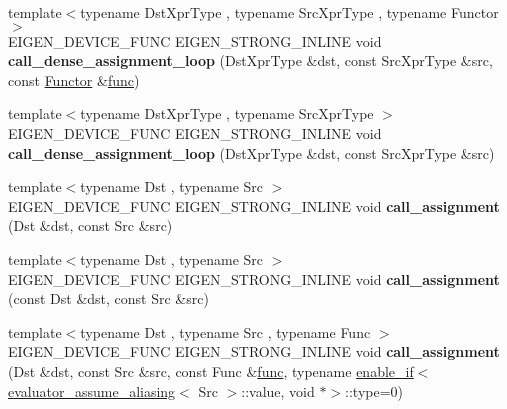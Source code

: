 \begin{DoxyCompactItemize}
{\footnotesize template$<$typename Dst\+Xpr\+Type , typename Src\+Xpr\+Type , typename Functor $>$ }\\E\+I\+G\+E\+N\+\_\+\+D\+E\+V\+I\+C\+E\+\_\+\+F\+U\+NC E\+I\+G\+E\+N\+\_\+\+S\+T\+R\+O\+N\+G\+\_\+\+I\+N\+L\+I\+NE void {\bfseries call\+\_\+dense\+\_\+assignment\+\_\+loop} (Dst\+Xpr\+Type \&dst, const Src\+Xpr\+Type \&src, const \hyperlink{struct_functor}{Functor} \&\hyperlink{structfunc}{func})
\item 
\mbox{\label{namespace_eigen_1_1internal_ac2c8860de31cf24c929f08fb6629eea2}} 
{\footnotesize template$<$typename Dst\+Xpr\+Type , typename Src\+Xpr\+Type $>$ }\\E\+I\+G\+E\+N\+\_\+\+D\+E\+V\+I\+C\+E\+\_\+\+F\+U\+NC E\+I\+G\+E\+N\+\_\+\+S\+T\+R\+O\+N\+G\+\_\+\+I\+N\+L\+I\+NE void {\bfseries call\+\_\+dense\+\_\+assignment\+\_\+loop} (Dst\+Xpr\+Type \&dst, const Src\+Xpr\+Type \&src)
\item 
\mbox{\label{namespace_eigen_1_1internal_a77793e4b74b9919e35295c839f2659b2}} 
{\footnotesize template$<$typename Dst , typename Src $>$ }\\E\+I\+G\+E\+N\+\_\+\+D\+E\+V\+I\+C\+E\+\_\+\+F\+U\+NC E\+I\+G\+E\+N\+\_\+\+S\+T\+R\+O\+N\+G\+\_\+\+I\+N\+L\+I\+NE void {\bfseries call\+\_\+assignment} (Dst \&dst, const Src \&src)
\item 
\mbox{\label{namespace_eigen_1_1internal_aa3db05ef2ee5dcf41ed295e769476879}} 
{\footnotesize template$<$typename Dst , typename Src $>$ }\\E\+I\+G\+E\+N\+\_\+\+D\+E\+V\+I\+C\+E\+\_\+\+F\+U\+NC E\+I\+G\+E\+N\+\_\+\+S\+T\+R\+O\+N\+G\+\_\+\+I\+N\+L\+I\+NE void {\bfseries call\+\_\+assignment} (const Dst \&dst, const Src \&src)
\item 
\mbox{\label{namespace_eigen_1_1internal_a2d05f73f407a32a3e3a188d105c5e37d}} 
{\footnotesize template$<$typename Dst , typename Src , typename Func $>$ }\\E\+I\+G\+E\+N\+\_\+\+D\+E\+V\+I\+C\+E\+\_\+\+F\+U\+NC E\+I\+G\+E\+N\+\_\+\+S\+T\+R\+O\+N\+G\+\_\+\+I\+N\+L\+I\+NE void {\bfseries call\+\_\+assignment} (Dst \&dst, const Src \&src, const Func \&\hyperlink{structfunc}{func}, typename \hyperlink{struct_eigen_1_1internal_1_1enable__if}{enable\+\_\+if}$<$ \hyperlink{struct_eigen_1_1internal_1_1evaluator__assume__aliasing}{evaluator\+\_\+assume\+\_\+aliasing}$<$ Src $>$\+::value, void $\ast$$>$\+::type=0)
$$
\end{DoxyCompactItemize}

